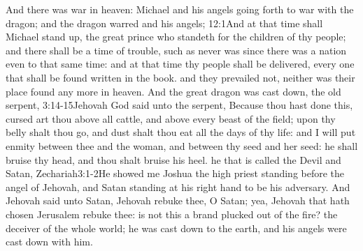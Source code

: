 And there was war in heaven: Michael and his angels going forth to war with the dragon; and the dragon warred and his angels;%
					{12:1}{And at that time shall Michael stand up, the great prince who standeth for the children of thy people; and there shall be a time of trouble, such as never was since there was a nation even to that same time: and at that time thy people shall be delivered, every one that shall be found written in the book.} %
and they prevailed not, neither was their place found any more in heaven.%
And the great dragon was cast down, the old serpent,%
						{3:14-15}{Jehovah God said unto the serpent, Because thou hast done this, cursed art thou above all cattle, and above every beast of the field; upon thy belly shalt thou go, and dust shalt thou eat all the days of thy life: and I will put enmity between thee and the woman, and between thy seed and her seed: he shall bruise thy head, and thou shalt bruise his heel.} %
he that is called the Devil and Satan,%
		{Zechariah}{3:1-2}{He showed me Joshua the high priest standing before the angel of Jehovah, and Satan standing at his right hand to be his adversary. And Jehovah said unto Satan, Jehovah rebuke thee, O Satan; yea, Jehovah that hath chosen Jerusalem rebuke thee: is not this a brand plucked out of the fire?} %
the deceiver of the whole world; he was cast down to the earth, and his angels were cast down with him. 
